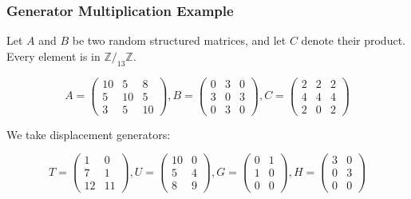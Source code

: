 \subsubsection{Generator Multiplication Example}
Let $A$ and $B$ be two random structured matrices, and let $C$ denote
their product.
Every element is in $\mathbb{Z}/_{13}\mathbb{Z}$.

\begin{equation}
  A =
  \begin{pmatrix}
    10    & 5     & 8 \\
    5     & 10     & 5 \\
    3     & 5     & 10
  \end{pmatrix},
  B =
  \begin{pmatrix}
    0     & 3     & 0 \\
    3    & 0     & 3 \\
    0     &3     & 0
  \end{pmatrix},
  C =
  \begin{pmatrix}
    2     & 2     & 2 \\
    4     & 4     & 4 \\
    2     & 0     & 2
  \end{pmatrix}
\end{equation}

We take displacement generators:

\begin{equation}
  T =
  \begin{pmatrix}
    1    & 0     \\
    7     & 1    \\
    12     & 11
  \end{pmatrix},
  U =
  \begin{pmatrix}
    10     & 0      \\
    5     & 4      \\
    8     & 9
  \end{pmatrix},
  G =
  \begin{pmatrix}
    0    & 1      \\
    1     & 0      \\
    0     & 0
  \end{pmatrix},
  H =
  \begin{pmatrix}
    3     & 0      \\
    0     & 3      \\
    0     & 0
  \end{pmatrix}
\end{equation}

